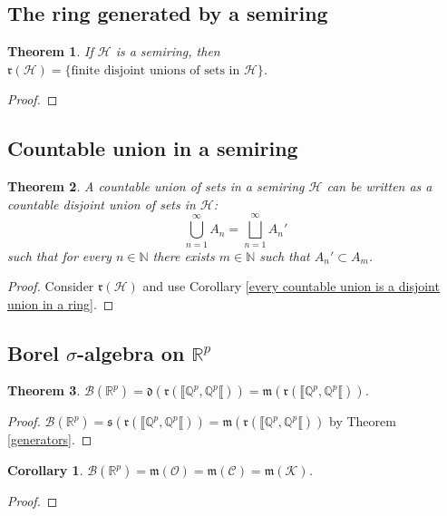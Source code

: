\documentclass[11pt, a4paper, openany]{book}
\newtheorem{thm}{Theorem}\newtheorem{lem}{Lemma}\newtheorem{crl}{Corollary}
\theoremstyle{definition}
\begin{document}
\subsection{The ring generated by a semiring}
    \begin{thm}\label{ring generated by semiring}
        If $\mathscr{H}$ is a semiring, then $\mathfrak{r}(\mathscr{H})=\{\text{finite disjoint unions of sets in }\mathscr{H}\}$.
    \end{thm}
    \begin{proof}
        
    \end{proof}
\subsection{Countable union in a semiring}
    \begin{thm}\label{every countable union is a disjoint union in a semiring}
        A countable union of sets in a semiring $\mathscr{H}$ can be written as a countable disjoint union of sets in $\mathscr{H}$:
        \[
            \bigcup_{n=1}^\infty A_n=\bigsqcup_{n=1}^\infty A_n'
        \]
        such that for every $n\in\mathbb{N}$ there exists $m\in\mathbb{N}$ such that $A_n'\subset A_m$.
    \end{thm}
    \begin{proof}
        Consider $\mathfrak{r}(\mathscr{H})$ and use Corollary \ref{every countable union is a disjoint union in a ring}.
    \end{proof}
\subsection{Borel \texorpdfstring{$\sigma$}{sigma}-algebra on \texorpdfstring{$\mathbb{R}^p$}{Rp}}
    \begin{thm}
        $\mathscr{B}(\mathbb{R}^p)=\mathfrak{d}(\mathfrak{r}(\llbracket \mathbb{Q}^p,\mathbb{Q}^p\llbracket))=\mathfrak{m}(\mathfrak{r}(\llbracket \mathbb{Q}^p,\mathbb{Q}^p\llbracket))$.
    \end{thm}
    \begin{proof}
        $\mathscr{B}(\mathbb{R}^p)=\mathfrak{s}(\mathfrak{r}(\llbracket \mathbb{Q}^p,\mathbb{Q}^p\llbracket))=\mathfrak{m}(\mathfrak{r}(\llbracket \mathbb{Q}^p,\mathbb{Q}^p\llbracket))$ by Theorem \ref{generators}.
    \end{proof}
    \begin{crl}
        $\mathscr{B}(\mathbb{R}^p)=\mathfrak{m}(\mathscr{O})=\mathfrak{m}(\mathscr{C})=\mathfrak{m}(\mathscr{K})$.
    \end{crl}
    \begin{proof}
        
    \end{proof}
\end{document}
